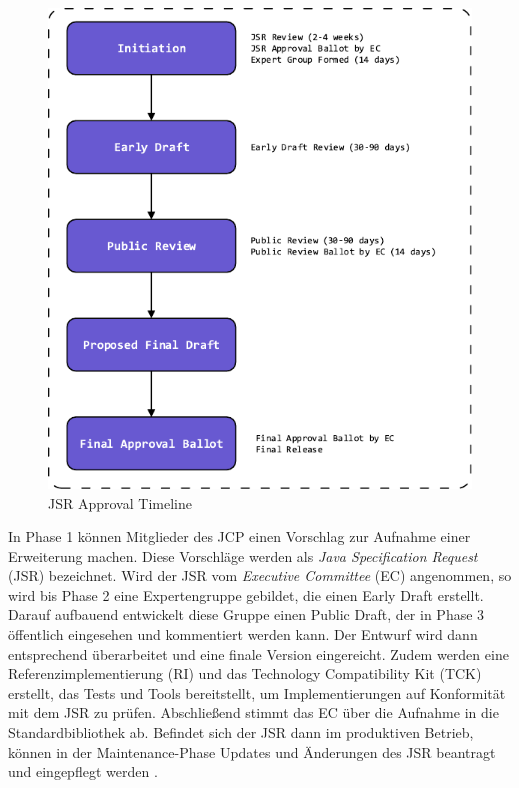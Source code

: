 \documentclass[11pt,a4paper,titlepage]{scrartcl}
\numberwithin{equation}{section}
\begin{document}
\begin{figure}[ht] 
	\begin{center}
		\includegraphics[scale=1]{img/jsr.pdf}
		\caption{JSR Approval Timeline}
		\label{fig:wsAPIJSRApproval}
	\end{center}
\end{figure}

\noindent In Phase 1 können Mitglieder des JCP einen Vorschlag zur Aufnahme einer Erweiterung machen. Diese Vorschläge werden als \textit{Java Specification Request} (JSR) bezeichnet. Wird der JSR vom \textit{Executive Committee} (EC) angenommen, so wird bis Phase 2 eine Expertengruppe gebildet, die einen Early Draft erstellt. Darauf aufbauend entwickelt diese Gruppe einen Public Draft, der in Phase 3 öffentlich eingesehen und kommentiert werden kann. Der Entwurf wird dann entsprechend überarbeitet und eine finale Version eingereicht. Zudem werden eine Referenzimplementierung (RI) und das Technology Compatibility Kit (TCK) erstellt, das Tests und Tools bereitstellt, um Implementierungen auf Konformität mit dem JSR zu prüfen. Abschließend stimmt das EC über die Aufnahme in die Standardbibliothek ab. Befindet sich der JSR dann im produktiven Betrieb, können in der Maintenance-Phase Updates und Änderungen des JSR beantragt und eingepflegt werden \autocite{oracle_corporation_java_2017}.\\
\end{document}
